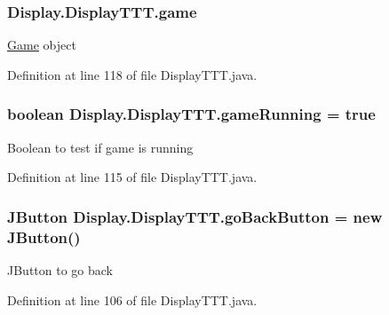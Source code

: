 \subsubsection[{game}]{ Display.\+Display\+T\+T\+T.\+game\hspace{0.3cm}{\ttfamily [private]}}\label{class_display_1_1_display_t_t_t_a2e4a57cf17355b6a63f5b9d4e9e74de4}
\hyperlink{namespace_game}{Game} object 

Definition at line 118 of file Display\+T\+T\+T.\+java.

\hypertarget{class_display_1_1_display_t_t_t_a8d67b95462ceda8ce22f992628f91ca4}{}
\subsubsection[{game\+Running}]{\setlength{\rightskip}{0pt plus 5cm}boolean Display.\+Display\+T\+T\+T.\+game\+Running = true\hspace{0.3cm}{\ttfamily [private]}}\label{class_display_1_1_display_t_t_t_a8d67b95462ceda8ce22f992628f91ca4}
Boolean to test if game is running 

Definition at line 115 of file Display\+T\+T\+T.\+java.

\hypertarget{class_display_1_1_display_t_t_t_a25d9abae3eed1579b8c8a59f7d0450fa}{}
\subsubsection[{go\+Back\+Button}]{\setlength{\rightskip}{0pt plus 5cm}J\+Button Display.\+Display\+T\+T\+T.\+go\+Back\+Button = new J\+Button()\hspace{0.3cm}{\ttfamily [private]}}\label{class_display_1_1_display_t_t_t_a25d9abae3eed1579b8c8a59f7d0450fa}
J\+Button to go back 

Definition at line 106 of file Display\+T\+T\+T.\+java.

\hypertarget{class_display_1_1_display_t_t_t_a863d5b47363b01c44552068cd9ee832f}{}
